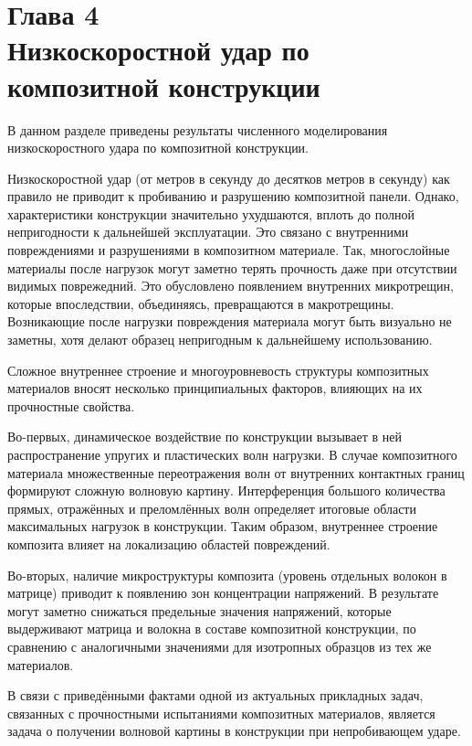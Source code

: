 \clearpage
\newpage


\section*{Глава 4\\Низкоскоростной удар по композитной конструкции}
\setcounter{section}{4}
\setcounter{subsection}{0}

В данном разделе приведены результаты численного моделирования низкоскоростного
удара по композитной конструкции.

Низкоскоростной удар (от метров в секунду до десятков метров в секунду) 
как правило не приводит к пробиванию и разрушению композитной панели. Однако, 
характеристики конструкции значительно ухудшаются, вплоть до полной непригодности к 
дальнейшей эксплуатации. Это связано с внутренними повреждениями и разрушениями 
в композитном материале. Так, многослойные материалы после нагрузок могут заметно 
терять прочность даже при отсутствии видимых поврежедний.
Это обусловлено появлением внутренних микротрещин, которые впоследствии, объединяясь,
превращаются в макротрещины. Возникающие после нагрузки повреждения
материала могут быть визуально не заметны, хотя делают образец непригодным к
дальнейшему использованию.

Сложное внутреннее строение и многоуровневость структуры композитных материалов вносят несколько 
принципиальных факторов, влияющих на их прочностные свойства.

Во-первых, динамическое воздействие по конструкции вызывает в ней распространение упругих и пластических волн 
нагрузки. В случае композитного материала множественные переотражения волн от внутренних контактных 
границ формируют сложную волновую картину. Интерференция большого количества 
прямых, отражённых и преломлённых волн определяет итоговые области максимальных нагрузок в конструкции. 
Таким образом, внутреннее строение композита влияет на локализацию областей повреждений.

Во-вторых, наличие микроструктуры композита (уровень отдельных волокон в матрице) приводит к появлению зон 
концентрации напряжений. В результате могут заметно снижаться предельные значения напряжений, которые 
выдерживают матрица и волокна в составе композитной конструкции, по сравнению с аналогичными значениями
для изотропных образцов из тех же материалов.

В связи с приведёнными фактами одной из актуальных прикладных задач, связанных с прочностными испытаниями 
композитных материалов, является задача о получении волновой картины в конструкции при
непробивающем ударе. 


